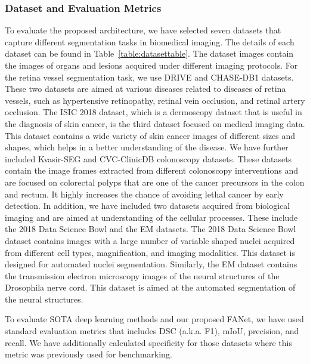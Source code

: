\documentclass[journal]{IEEEtran}
\begin{document}
\subsubsection{Dataset and Evaluation Metrics}
To evaluate the proposed architecture, we have selected seven datasets that capture different segmentation tasks in biomedical imaging. The details of each dataset can be found in Table~\ref{table:datasettable}. The dataset images contain the images of organs and lesions acquired under different imaging protocols. For the retina vessel segmentation task, we use DRIVE and CHASE-DB1 datasets. These two datasets are aimed at various diseases related to diseases of retina vessels, such as hypertensive retinopathy, retinal vein occlusion, and retinal artery occlusion. The ISIC 2018 dataset, which is a dermoscopy dataset that is useful in the diagnosis of skin cancer, is the third dataset focused on medical imaging data. This dataset contains a wide variety of skin cancer images of different sizes and shapes, which helps in a better understanding of the disease. We have further included Kvasir-SEG and CVC-ClinicDB colonoscopy datasets. These datasets contain the image frames extracted from different colonoscopy interventions and are focused on colorectal polyps that are one of the cancer precursors in the colon and rectum. It highly increases the chance of avoiding lethal cancer by early detection. In addition, we have included two datasets acquired from biological imaging and are aimed at understanding of the cellular processes. These include the 2018 Data Science Bowl and the EM datasets. The 2018 Data Science Bowl dataset contains images with a large number of variable shaped nuclei acquired from different cell types, magnification, and imaging modalities. This dataset is designed for automated nuclei segmentation. Similarly, the EM dataset contains the transmission electron microscopy images of the neural structures of the Drosophila nerve cord. This dataset is aimed at the automated segmentation of the neural structures. 

To evaluate SOTA deep learning methods and our proposed FANet, we have used standard evaluation metrics that includes \ac{DSC} (a.k.a. F1), \ac{mIoU}, precision, and recall. We have additionally calculated specificity for those datasets where this metric was previously used for benchmarking.  
\end{document}
